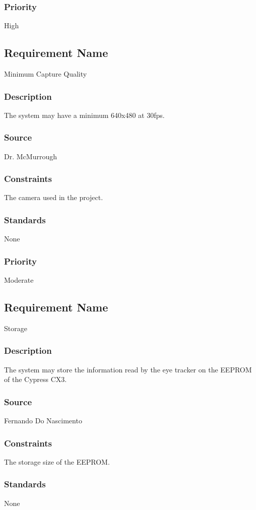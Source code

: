 \subsubsection{Priority}
High

\subsection{Requirement Name}
Minimum Capture Quality
\subsubsection{Description}
The system may have a minimum 640x480 at 30fps.
\subsubsection{Source}
Dr. McMurrough
\subsubsection{Constraints}
The camera used in the project.
\subsubsection{Standards}
None
\subsubsection{Priority}
Moderate

\subsection{Requirement Name}
Storage
\subsubsection{Description}
The system may store the information read by the eye tracker on the EEPROM of the Cypress CX3.
\subsubsection{Source}
Fernando Do Nascimento
\subsubsection{Constraints}
The storage size of the EEPROM.
\subsubsection{Standards}
None
